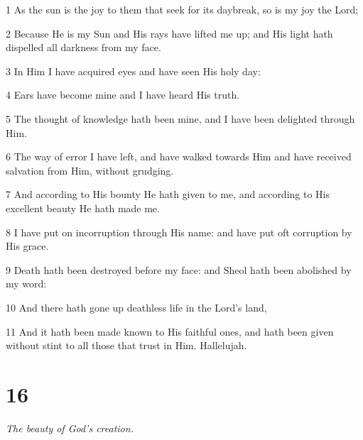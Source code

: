 \par 1 As the sun is the joy to them that seek for its daybreak, so is my joy the Lord;
\par 2 Because He is my Sun and His rays have lifted me up; and His light hath dispelled all darkness from my face.
\par 3 In Him I have acquired eyes and have seen His holy day:
\par 4 Ears have become mine and I have heard His truth.
\par 5 The thought of knowledge hath been mine, and I have been delighted through Him.
\par 6 The way of error I have left, and have walked towards Him and have received salvation from Him, without grudging.
\par 7 And according to His bounty He hath given to me, and according to His excellent beauty He hath made me.
\par 8 I have put on incorruption through His name: and have put oft corruption by His grace.
\par 9 Death hath been destroyed before my face: and Sheol hath been abolished by my word:
\par 10 And there hath gone up deathless life in the Lord's land,
\par 11 And it hath been made known to His faithful ones, and hath been given without stint to all those that trust in Him. Hallelujah.

\chapter{16}

\par \textit{The beauty of God's creation.}

